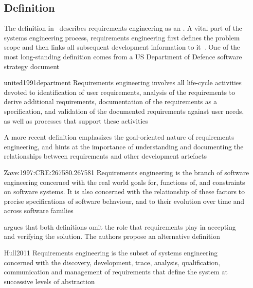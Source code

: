 \documentclass[dissertation,final]{softeng}
\begin{document}
\subsection{Definition}
The definition in~ describes requirements engineering as an \emph{}. A vital part of the systems engineering process, requirements engineering first defines the problem scope and then links all subsequent development information to it~\citep{Hull2011}. One of the most long-standing definition comes from a US Department of Defence software strategy document

\begin{displaycquote}{united1991department}
Requirements engineering involves all life-cycle activities devoted to identification of user requirements, analysis of the requirements to derive additional requirements, documentation of the requirements as a specification, and validation of the documented requirements against user needs, as well as processes that support these activities
\end{displaycquote}

A more recent definition emphasizes the goal-oriented nature of requirements engineering, and hints at the importance of understanding and documenting the relationships between requirements and other development artefacts

\begin{displaycquote}{Zave:1997:CRE:267580.267581}
Requirements engineering is the branch of software engineering concerned with the real world goals for, functions of, and constraints on software systems. It is also concerned with the relationship of these factors to precise specifications of software behaviour, and to their evolution over time and across software families
\end{displaycquote}

\citet{Hull2011} argues that both definitions omit the role that requirements play in accepting and verifying the solution. The authors propose an alternative definition

\begin{displaycquote}{Hull2011}
Requirements engineering is the subset of systems engineering concerned with the discovery, development, trace, analysis, qualification, communication and management of requirements that define the system at successive levels of abstraction
\end{displaycquote}
\end{document}
